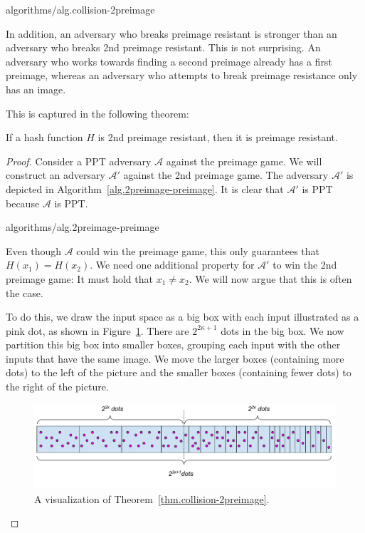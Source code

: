 {algorithms/alg.collision-2preimage}

In addition, an adversary who breaks preimage resistant is stronger than an adversary who breaks 2nd preimage resistant. This is not surprising. An adversary who works towards finding a second preimage already has a first preimage, whereas an adversary who attempts to break preimage resistance only has an image.

This is captured in the following theorem:

\begin{theorem}
  \label{thm.2preimage-preimage}
  If a hash function $H$ is 2nd preimage resistant, then it is preimage resistant.
\end{theorem}
\begin{proof}
  Consider a PPT adversary $\mathcal{A}$ against the preimage game.
  We will construct an adversary $\mathcal{A}'$ against the 2nd preimage game. The adversary $\mathcal{A}'$ is depicted
  in Algorithm~\ref{alg.2preimage-preimage}. It is clear that $\mathcal{A}'$ is PPT because $\mathcal{A}$ is PPT.

  {algorithms/alg.2preimage-preimage}

  Even though $\mathcal{A}$ could win the preimage game, this only guarantees that $H(x_1) = H(x_2)$.
  We need one additional property for $\mathcal{A}'$ to win the 2nd preimage game: It must hold that $x_1 \neq x_2$.
  We will now argue that this is often the case.

  To do this, we draw the input space as a big box with
  each input illustrated as a pink dot, as shown in Figure~\ref{fig.2preimage-preimage}. There are $2^{2\kappa + 1}$ dots in the big box. We now partition this big box into smaller boxes, grouping each input with the other inputs that have the same image. We move the larger boxes (containing more dots) to the left of the picture and the smaller boxes (containing fewer dots) to the right of the picture.

  \begin{figure}[H]
    \centering
    \includegraphics[width=\columnwidth,keepaspectratio]{figures/2preimage-preimage.pdf}
    \caption{A visualization of Theorem~\ref{thm.collision-2preimage}.}
    \label{fig.2preimage-preimage}
  \end{figure}


\end{proof}
